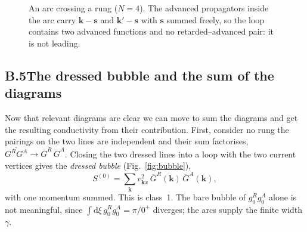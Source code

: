 \begin{figure}[ht]
\centering
{}
\caption{An arc crossing a rung ($N=4$). The advanced
propagators inside the arc carry $\mathbf k-\mathbf s$ and
$\mathbf k'-\mathbf s$ with $\mathbf s$ summed freely, so the
loop contains two advanced functions and no retarded--advanced
pair: it is not leading.}
\label{fig:straddle}
\end{figure}


\subsection*{B.5\quad The dressed bubble and the sum of the diagrams}

Now that relevant diagrams are clear we can move to sum the diagrams and get the resulting conductivity from their contribution. First, consider no rung the pairings on the two lines are independent and their sum factorises,
$\overline{G^RG^A}\to\overline G^R\,\overline G^A$.
Closing the two dressed lines into a loop with the two current
vertices gives the \emph{dressed bubble}
(Fig.~\ref{fig:bubble}),
\begin{equation}
S^{(0)}
=\sum_{\mathbf k}v_{\mathbf k x}^2\,
\overline G^R(\mathbf k)\,
\overline G^A(\mathbf k),
\label{eq:S0}
\end{equation}
with one momentum summed. This is class~1. The bare bubble of
$g_0^Rg_0^A$ alone is not meaningful, since
$\int\mathrm{d}\xi\,g_0^Rg_0^A=\pi/0^+$ diverges; the arcs
supply the finite width $\gamma$.

